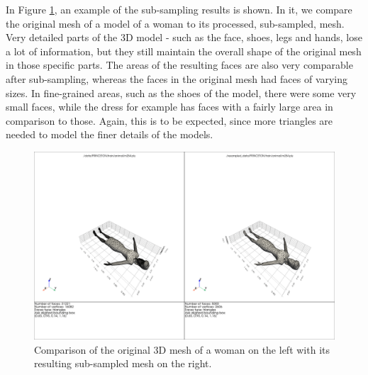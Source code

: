 In Figure \ref{fig:resampled_woman}, an example of the sub-sampling results is shown.
In it, we compare the original mesh of a model of a woman to its processed, sub-sampled, mesh.
Very detailed parts of the 3D model - such as the face, shoes, legs and hands, lose a lot of information, but they
still maintain the overall shape of the original mesh in those specific parts.
The areas of the resulting faces are also very comparable after sub-sampling, whereas the faces in the original mesh
had faces of varying sizes.
In fine-grained areas, such as the shoes of the model, there were some very small faces, while the dress for example
has faces with a fairly large area in comparison to those.
Again, this is to be expected, since more triangles are needed to model the finer details of the models.

\begin{figure}[ht]
  \includegraphics[width=\linewidth]
  {assets/preprocessing/resampling/woman_resampled.png}
  \caption{Comparison of the original 3D mesh of a woman on the left with its resulting sub-sampled mesh on the right.}
  \label{fig:resampled_woman}
\end{figure}

